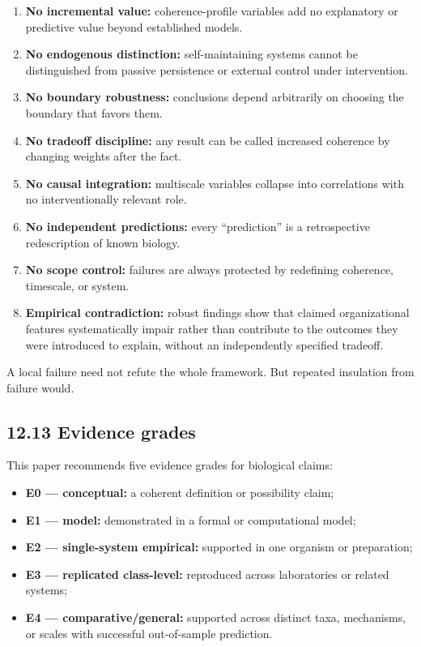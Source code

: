 \documentclass[
  11pt,
]{article}
\providecommand{\tightlist}{%
  \setlength{\itemsep}{0pt}\setlength{\parskip}{0pt}}
\begin{document}
\begin{enumerate}
\def\labelenumi{\arabic{enumi}.}
\tightlist
\item
  \textbf{No incremental value:} coherence-profile variables add no
  explanatory or predictive value beyond established models.
\item
  \textbf{No endogenous distinction:} self-maintaining systems cannot be
  distinguished from passive persistence or external control under
  intervention.
\item
  \textbf{No boundary robustness:} conclusions depend arbitrarily on
  choosing the boundary that favors them.
\item
  \textbf{No tradeoff discipline:} any result can be called increased
  coherence by changing weights after the fact.
\item
  \textbf{No causal integration:} multiscale variables collapse into
  correlations with no interventionally relevant role.
\item
  \textbf{No independent predictions:} every ``prediction'' is a
  retrospective redescription of known biology.
\item
  \textbf{No scope control:} failures are always protected by redefining
  coherence, timescale, or system.
\item
  \textbf{Empirical contradiction:} robust findings show that claimed
  organizational features systematically impair rather than contribute
  to the outcomes they were introduced to explain, without an
  independently specified tradeoff.
\end{enumerate}

A local failure need not refute the whole framework. But repeated
insulation from failure would.

\subsection{12.13 Evidence grades}\label{evidence-grades}

This paper recommends five evidence grades for biological claims:

\begin{itemize}
\tightlist
\item
  \textbf{E0 --- conceptual:} a coherent definition or possibility
  claim;
\item
  \textbf{E1 --- model:} demonstrated in a formal or computational
  model;
\item
  \textbf{E2 --- single-system empirical:} supported in one organism or
  preparation;
\item
  \textbf{E3 --- replicated class-level:} reproduced across laboratories
  or related systems;
\item
  \textbf{E4 --- comparative/general:} supported across distinct taxa,
  mechanisms, or scales with successful out-of-sample prediction.
\end{itemize}
\end{document}
